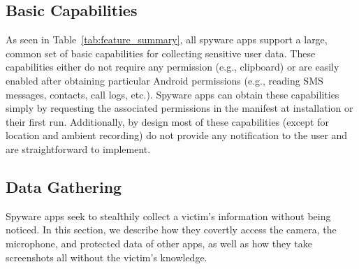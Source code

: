 




\subsection{Basic Capabilities}
\label{subsec:features_enabled_by_permission}
As seen in Table~\ref{tab:feature_summary}, all spyware apps support a large, common set of basic capabilities for collecting sensitive user data.
These capabilities either do not require any permission (e.g., clipboard) or are easily enabled after obtaining particular Android permissions (e.g., reading SMS messages, contacts, call logs, etc.). Spyware apps can obtain these capabilities simply by
requesting the associated permissions in the manifest at installation or their first run.
Additionally, by design most of these capabilities
(except for location and ambient recording) do not provide any notification to
the user and are straightforward to implement.


\subsection{Data Gathering}
\label{subsec:data_gathering}
Spyware apps seek to stealthily collect a victim's information without being noticed. In this section, we describe how they covertly access the camera, the microphone, and protected data of other apps, as well as how they take screenshots all without the victim's knowledge.

